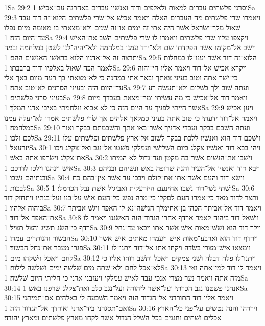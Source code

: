 1Sa 29:2  וסרני פלשׁתים עברים למאות ולאלפים ודוד ואנשׁיו עברים באחרנה עם־אכישׁ׃
1Sa 29:3  ויאמרו שׂרי פלשׁתים מה העברים האלה ויאמר אכישׁ אל־שׂרי פלשׁתים הלוא־זה דוד עבד שׁאול מלך־ישׂראל אשׁר היה אתי זה ימים או־זה שׁנים ולא־מצאתי בו מאומה מיום נפלו עד־היום הזה׃
1Sa 29:4  ויקצפו עליו שׂרי פלשׁתים ויאמרו לו שׂרי פלשׁתים השׁב את־האישׁ וישׁב אל־מקומו אשׁר הפקדתו שׁם ולא־ירד עמנו במלחמה ולא־יהיה־לנו לשׂטן במלחמה ובמה יתרצה זה אל־אדניו הלוא בראשׁי האנשׁים ההם׃
1Sa 29:5  הלוא־זה דוד אשׁר יענו־לו במחלות לאמר הכה שׁאול באלפיו ודוד ברבבתו׃
1Sa 29:6  ויקרא אכישׁ אל־דוד ויאמר אליו חי־יהוה כי־ישׁר אתה וטוב בעיני צאתך ובאך אתי במחנה כי לא־מצאתי בך רעה מיום באך אלי עד־היום הזה ובעיני הסרנים לא־טוב אתה׃
1Sa 29:7  ועתה שׁוב ולך בשׁלום ולא־תעשׂה רע בעיני סרני פלשׁתים׃
1Sa 29:8  ויאמר דוד אל־אכישׁ כי מה עשׂיתי ומה־מצאת בעבדך מיום אשׁר הייתי לפניך עד היום הזה כי לא אבוא ונלחמתי באיבי אדני המלך׃
1Sa 29:9  ויען אכישׁ ויאמר אל־דוד ידעתי כי טוב אתה בעיני כמלאך אלהים אך שׂרי פלשׁתים אמרו לא־יעלה עמנו במלחמה׃
1Sa 29:10  ועתה השׁכם בבקר ועבדי אדניך אשׁר־באו אתך והשׁכמתם בבקר ואור לכם ולכו׃
1Sa 29:11  וישׁכם דוד הוא ואנשׁיו ללכת בבקר לשׁוב אל־ארץ פלשׁתים ופלשׁתים עלו יזרעאל׃
1Sa 30:1  ויהי בבא דוד ואנשׁיו צקלג ביום השׁלישׁי ועמלקי פשׁטו אל־נגב ואל־צקלג ויכו את־צקלג וישׂרפו אתה באשׁ׃
1Sa 30:2  וישׁבו את־הנשׁים אשׁר־בה מקטן ועד־גדול לא המיתו אישׁ וינהגו וילכו לדרכם׃
1Sa 30:3  ויבא דוד ואנשׁיו אל־העיר והנה שׂרופה באשׁ ונשׁיהם ובניהם ובנתיהם נשׁבו׃
1Sa 30:4  וישׂא דוד והעם אשׁר־אתו את־קולם ויבכו עד אשׁר אין־בהם כח לבכות׃
1Sa 30:5  ושׁתי נשׁי־דוד נשׁבו אחינעם היזרעלית ואביגיל אשׁת נבל הכרמלי׃
1Sa 30:6  ותצר לדוד מאד כי־אמרו העם לסקלו כי־מרה נפשׁ כל־העם אישׁ על־בנו ועל־בנתיו ויתחזק דוד ביהוה אלהיו׃
1Sa 30:7  ויאמר דוד אל־אביתר הכהן בן־אחימלך הגישׁה־נא לי האפד ויגשׁ אביתר את־האפד אל־דוד׃
1Sa 30:8  וישׁאל דוד ביהוה לאמר ארדף אחרי הגדוד־הזה האשׂגנו ויאמר לו רדף כי־השׂג תשׂיג והצל תציל׃
1Sa 30:9  וילך דוד הוא ושׁשׁ־מאות אישׁ אשׁר אתו ויבאו עד־נחל הבשׂור והנותרים עמדו׃
1Sa 30:10  וירדף דוד הוא וארבע־מאות אישׁ ויעמדו מאתים אישׁ אשׁר פגרו מעבר את־נחל הבשׂור׃
1Sa 30:11  וימצאו אישׁ־מצרי בשׂדה ויקחו אתו אל־דוד ויתנו־לו לחם ויאכל וישׁקהו מים׃
1Sa 30:12  ויתנו־לו פלח דבלה ושׁני צמקים ויאכל ותשׁב רוחו אליו כי לא־אכל לחם ולא־שׁתה מים שׁלשׁה ימים ושׁלשׁה לילות׃
1Sa 30:13  ויאמר לו דוד למי־אתה ואי מזה אתה ויאמר נער מצרי אנכי עבד לאישׁ עמלקי ויעזבני אדני כי חליתי היום שׁלשׁה׃
1Sa 30:14  אנחנו פשׁטנו נגב הכרתי ועל־אשׁר ליהודה ועל־נגב כלב ואת־צקלג שׂרפנו באשׁ׃
1Sa 30:15  ויאמר אליו דוד התורדני אל־הגדוד הזה ויאמר השׁבעה לי באלהים אם־תמיתני ואם־תסגרני ביד־אדני ואורדך אל־הגדוד הזה׃
1Sa 30:16  וירדהו והנה נטשׁים על־פני כל־הארץ אכלים ושׁתים וחגגים בכל השׁלל הגדול אשׁר לקחו מארץ פלשׁתים ומארץ יהודה׃
